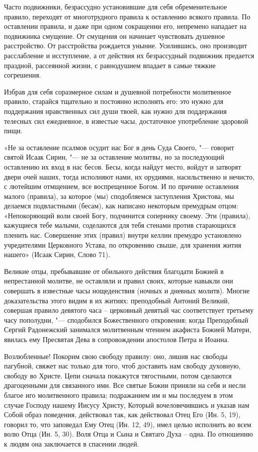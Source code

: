 Часто подвижники, безрассудно установившие для себя обременительное правило, переходят от многотрудного правила к оставлению всякого правила. По оставлении правила, и даже при одном сокращении его, непремено нападает на подвижника смущение. От смущения он начинает чувствовать душевное расстройство. От расстройства рождается уныние. Усилившись, оно производит расслабление и исступление, а от действия их безрассудный подвижник предается праздной, рассеянной жизни, с равнодушием впадает в самые тяжкие согрешения.

Избрав для себя соразмерное силам и душевной потребности молитвенное правило, старайся тщательно и постоянно исполнять его: это нужно для поддержания нравственных сил души твоей, как нужно для поддержания телесных сил ежедневное, в известые часы, достаточное употребление здоровой пищи.

«Не за оставление псалмов осудит нас Бог в день Суда Своего, "--- говорит святой Исаак Сирин, "--- не за оставление молитвы, но за последующий оставлению их вход в нас бесов. Бесы, когда найдут место, войдут и затворят двери очей наших, тогда исполняют нами, их орудиями, насильственно и нечисто, с лютейшим отмщением, все воспрещенное Богом. И по причине оставления малого (правила), за которое (мы) сподобляемся заступления Христова, мы делаемся подвластными (бесам), как написано некоторым премудрым отцом: «Непокоряющий воли своей Богу, подчинится сопернику своему. Эти (правила), кажущиеся тебе малыми, соделаются для тебя стенами против старающихся пленить нас. Совершение этих (правил) внутри келлии премудро установлено учредителями Церковного Устава, по откровению свыше, для хранения жития нашего» (Исаак Сирин, Слово 71).

Великие отцы, пребывавшие от обильного действия благодати Божией в непрестанной молитве, не оставляли и правил своих, которые навыкли они совершать в известные часы нощеденствия (ночных и дневных молитв). Многие доказательства этого видим в их житиях: преподобный Антоний Великий, совершая правило девятого часа – церковный девятый час соответствует третьему часу пополудни, "--- сподобился Божественного откровения; когда Преподобный Сергий Радонежский занимался молитвенным чтением акафиста Божией Матери, явилась ему Пресвятая Дева в сопровождении апостолов Петра и Иоанна.

Возлюбленные! Покорим свою свободу правилу: оно, лишив нас свободы пагубной, свяжет нас только для того, чтоб доставить нам свободу духовную, свободу во Христе. Цепи сначала покажутся тягостными, потом сделаются драгоценными для связанного ими. Все святые Божии приняли на себя и несли благое иго молитвенного правила; подражанием им и мы последуем в этом случае Господу нашему Иисусу Христу, Который вочеловечившись и указав нам Собой образ поведения, действовал так, как действовал Отец Его (Ин. 5, 19), говорил то, что заповедал Ему Отец (Ин. 12, 49), имел целью исполнить во всем волю Отца (Ин. 5, 30). Воля Отца и Сына и Святаго Духа – одна. По отношению к людям она заключается в спасении людей.

